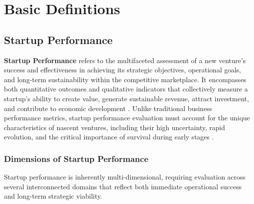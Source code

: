 \documentclass[../Main.tex]{subfiles}
\begin{document}
\section{Basic Definitions}
\subsection{Startup Performance}

\textbf{Startup Performance} refers to the multifaceted assessment of a new venture's success and effectiveness in achieving its strategic objectives, operational goals, and long-term sustainability within the competitive marketplace. It encompasses both quantitative outcomes and qualitative indicators that collectively measure a startup's ability to create value, generate sustainable revenue, attract investment, and contribute to economic development \cite{patton2014realising, barbero2012revisiting}. Unlike traditional business performance metrics, startup performance evaluation must account for the unique characteristics of nascent ventures, including their high uncertainty, rapid evolution, and the critical importance of survival during early stages \cite{mian1996assessing}.

\subsubsection*{Dimensions of Startup Performance}
Startup performance is inherently multi-dimensional, requiring evaluation across several interconnected domains that reflect both immediate operational success and long-term strategic viability.
\end{document}
